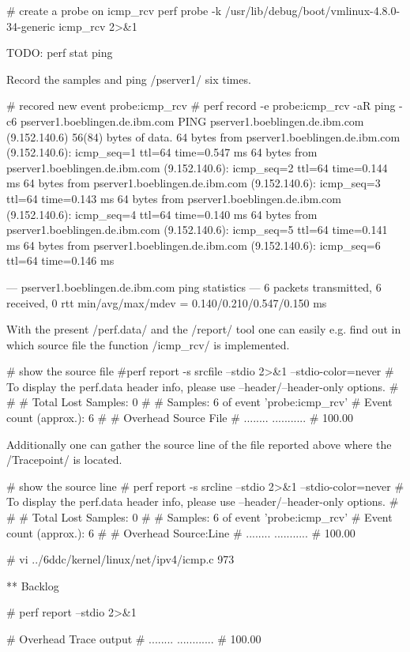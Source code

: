 \starttyping
# create a probe on icmp_rcv
perf probe -k /usr/lib/debug/boot/vmlinux-4.8.0-34-generic   icmp_rcv 2>&1
\stoptyping

\starttyping
TODO: perf stat ping
\stoptyping



Record the samples and ping /pserver1/ six times.

\starttyping
# recored new event probe:icmp_rcv
# perf record -e probe:icmp_rcv -aR ping -c6 pserver1.boeblingen.de.ibm.com
PING pserver1.boeblingen.de.ibm.com (9.152.140.6) 56(84) bytes of data.
64 bytes from pserver1.boeblingen.de.ibm.com (9.152.140.6): icmp_seq=1 ttl=64 time=0.547 ms
64 bytes from pserver1.boeblingen.de.ibm.com (9.152.140.6): icmp_seq=2 ttl=64 time=0.144 ms
64 bytes from pserver1.boeblingen.de.ibm.com (9.152.140.6): icmp_seq=3 ttl=64 time=0.143 ms
64 bytes from pserver1.boeblingen.de.ibm.com (9.152.140.6): icmp_seq=4 ttl=64 time=0.140 ms
64 bytes from pserver1.boeblingen.de.ibm.com (9.152.140.6): icmp_seq=5 ttl=64 time=0.141 ms
64 bytes from pserver1.boeblingen.de.ibm.com (9.152.140.6): icmp_seq=6 ttl=64 time=0.146 ms

--- pserver1.boeblingen.de.ibm.com ping statistics ---
6 packets transmitted, 6 received, 0%
rtt min/avg/max/mdev = 0.140/0.210/0.547/0.150 ms
\stoptyping


With the present /perf.data/ and the /report/ tool one can easily e.g.
find out in which source file the function /icmp_rcv/ is implemented.

\starttyping
# show the source file
#perf report -s srcfile --stdio 2>&1 --stdio-color=never
# To display the perf.data header info, please use --header/--header-only options.
#
#
# Total Lost Samples: 0
#
# Samples: 6  of event 'probe:icmp_rcv'
# Event count (approx.): 6
#
# Overhead  Source File
# ........  ...........
#
  100.00%


\stoptyping

Additionally one can gather the source line of the file reported above
where the /Tracepoint/ is located.

\starttyping
# show the source line
# perf report -s srcline --stdio 2>&1 --stdio-color=never
# To display the perf.data header info, please use --header/--header-only options.
#
#
# Total Lost Samples: 0
#
# Samples: 6  of event 'probe:icmp_rcv'
# Event count (approx.): 6
#
# Overhead  Source:Line
# ........  ...........
#
  100.00%


\stoptyping

\starttyping
# vi ../6ddc/kernel/linux/net/ipv4/icmp.c 973
\stoptyping


** Backlog

\starttyping
# perf report --stdio 2>&1

# Overhead  Trace output
# ........  ............
#
  100.00%

\stoptyping
